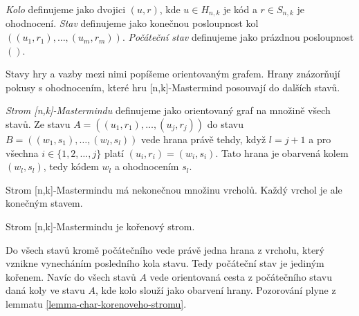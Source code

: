 \begin{definice}\label{stav}
   \emph{Kolo} definujeme jako dvojici $(u,r)$, kde $u \in H_{n,k}$ je kód a $r \in S_{n,k}$ je ohodnocení. 
   \emph{Stav} definujeme jako konečnou posloupnost kol $((u_1, r_1), \dots, (u_m, r_m))$. \emph{Počáteční stav} definujeme jako prázdnou posloupnost $()$.
\end{definice}

Stavy hry a vazby mezi nimi popíšeme orientovaným grafem. Hrany znázorňují pokusy s ohodnocením, které hru [n,k]-Mastermind posouvají do dalších stavů. 
\begin{definice}
  \emph{Strom [n,k]-Mastermindu} definujeme jako orientovaný graf na množině všech stavů. Ze stavu $A = \left((u_1, r_1),\dots, (u_j,r_j)\right)$ do stavu $B = \left((w_1, s_1), \dots, (w_l,s_l)\right)$ vede hrana právě tehdy, když $l = j+1$ a pro všechna $ i \in \{1,2,\dots, j\}$ platí $ (u_i, r_i) = (w_i, s_i)$. Tato hrana je obarvená kolem $(w_l, s_l)$, tedy kódem $w_l$ a ohodnocením $s_l$.
\end{definice}
\begin{pozn}
    Strom [n,k]-Mastermindu má nekonečnou množinu vrcholů. Každý vrchol je ale konečným stavem.
\end{pozn}
\begin{pozorovani}
    Strom [n,k]-Mastermindu je kořenový strom.
\end{pozorovani}
\begin{dukaz}
    Do všech stavů kromě počátečního vede právě jedna hrana z vrcholu, který vznikne vynecháním posledního kola stavu. Tedy počáteční stav je jediným kořenem. Navíc do všech stavů $A$ vede orientovaná cesta z počátečního stavu daná koly ve stavu $A$, kde kolo slouží jako obarvení hrany. Pozorování plyne z lemmatu \ref{lemma-char-korenoveho-stromu}.


    
\end{dukaz}

